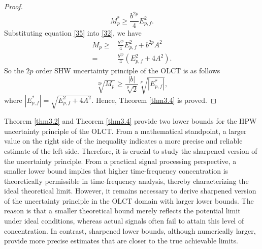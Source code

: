 \documentclass[preprint,12pt]{elsarticle}
\begin{document}
\begin{proof}
\begin{equation}
	\label{35}
	M_p^* \ge \frac{b^{2p}}{4} E_{p,f}^2.
	\end{equation}
	Substituting equation \eqref{35} into \eqref{32}, we have
	\begin{align}
	\label{36}
	M_p \ge& \frac{b^{2p}}{4} E_{p,f}^2+b^{2p} A^2 \nonumber\\
	=&\frac{b^{2p}}{4} \left( E_{p,f}^2+4A^2 \right).
	\end{align}
	So the $2p$ order SHW uncertainty principle of the OLCT is as follows
	\begin{equation*}
	\sqrt[2p]{M_p} \ge \frac{|b|}{\sqrt[p]{2}} \sqrt[p]{\left| E_{p,f}^{*} \right|},
	\end{equation*}
	where $\left| E_{p,f}^{*} \right| = \sqrt{E_{p,f}^2+4A^2}$.
	Hence, Theorem \ref{thm3.4} is proved.
\end{proof}

Theorem \ref{thm3.2} and Theorem \ref{thm3.4} provide two lower bounds for the HPW uncertainty principle of the OLCT. From a mathematical standpoint, a larger value on the right side of the inequality indicates a more precise and reliable estimate of the left side. Therefore, it is crucial to study the sharpened version of the uncertainty principle. From a practical signal processing perspective, a smaller lower bound implies that higher time-frequency concentration is theoretically permissible in time-frequency analysis, thereby characterizing the ideal theoretical limit. However, it remains necessary to derive sharpened version of the uncertainty principle in the OLCT domain with larger lower bounds. The reason is that a smaller theoretical bound merely reflects the potential limit under ideal conditions, whereas actual signals often fail to attain this level of concentration. In contrast, sharpened lower bounds, although numerically larger, provide more precise estimates that are closer to the true achievable limits. 
\end{document}
